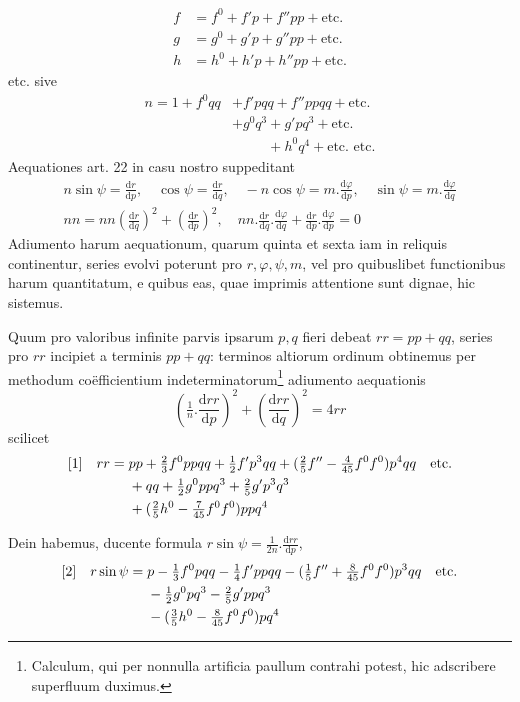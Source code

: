 %
\[
\begin{aligned}
f&=f^0+f'p+f''pp+\text{etc.}\\
g&=g^0+g'p+g''pp+\text{etc.}\\
h&=h^0+h'p+h''pp+\text{etc.}
\end{aligned}
\]
etc. sive
\[
\begin{aligned}
n=1+f^0qq&+f'pqq+f''ppqq+\text{etc.}\\
&+g^0q^3+g'pq^3+\text{etc.}\\
&\phantom{+g^0q^3}+h^0q^4+\text{etc. etc.}
\end{aligned}
\]
Aequationes art. 22 in casu nostro suppeditant
\[
\begin{gathered}
n\sin\psi=\frac{\mathrm{d}r}{\mathrm{d}p},\quad\cos\psi=\frac{\mathrm{d}r}{\mathrm{d}q},\quad-n\cos\psi=m\mathord{.}\frac{\mathrm{d}\varphi}{\mathrm{d}p},\quad\sin\psi=m\mathord{.}\frac{\mathrm{d}\varphi}{\mathrm{d}q}\\
nn=nn(\frac{\mathrm{d}r}{\mathrm{d}q})^2+(\frac{\mathrm{d}r}{\mathrm{d}p})^2,\quad nn\mathord{.}\frac{\mathrm{d}r}{\mathrm{d}q}\mathord{.}\frac{\mathrm{d}\varphi}{\mathrm{d}q}+\frac{\mathrm{d}r}{\mathrm{d}p}\mathord{.}\frac{\mathrm{d}\varphi}{\mathrm{d}p}=0
\end{gathered}
\]
Adiumento harum aequationum, quarum quinta et sexta iam in reliquis continentur, series evolvi poterunt pro \(r,\varphi,\psi,m\), vel pro quibuslibet functionibus harum quantitatum, e quibus eas, quae imprimis attentione sunt dignae, hic sistemus.

Quum pro valoribus infinite parvis ipsarum \(p,q\) fieri debeat \(rr=pp+qq\), series pro \(rr\) incipiet a terminis \(pp+qq\): terminos altiorum ordinum obtinemus per methodum coëfficientium indeterminatorum\footnote{Calculum, qui per nonnulla artificia paullum contrahi potest, hic adscribere superfluum duximus.} adiumento aequationis
\[
(\tfrac{1}{n}\mathord{.}\frac{\mathrm{d}rr}{\mathrm{d}p})^2+(\frac{\mathrm{d}rr}{\mathrm{d}q})^2=4rr
\]
scilicet
\[
\begin{aligned}
\relax[1]\quad rr={}&pp+\tfrac{2}{3}f^0ppqq+\tfrac{1}{2}f'p^3qq+(\tfrac{2}{5}f''-\tfrac{4}{45}f^0f^0)p^4qq\quad\text{etc.}\\
&+qq+\tfrac{1}{2}g^0ppq^3+\tfrac{2}{5}g'p^3q^3\\
&+(\tfrac{2}{5}h^0-\tfrac{7}{45}f^0f^0)ppq^4
\end{aligned}
\]

Dein habemus, ducente formula \(r\sin\psi=\frac{1}{2n}\mathord{.}\frac{\mathrm{d}rr}{\mathrm{d}p}\),
\[
\begin{aligned}
\relax[2]\quad r\sin\psi={}&p-\tfrac{1}{3}f^0pqq-\tfrac{1}{4}f'ppqq-(\tfrac{1}{5}f''+\tfrac{8}{45}f^0f^0)p^3qq\quad\text{etc.}\\
&-\tfrac{1}{2}g^0pq^3-\tfrac{2}{5}g'ppq^3\\
&-(\tfrac{3}{5}h^0-\tfrac{8}{45}f^0f^0)pq^4
\end{aligned}
\]
